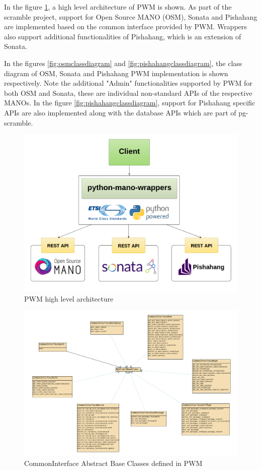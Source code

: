 In the figure \ref{fig:wrapperarch}, a high level architecture of PWM is shown. 
As part of the scramble project, support for Open Source MANO (OSM), Sonata and Pishahang are implemented based on the common interface provided by PWM. 
Wrappers also support additional functionalities of Pishahang, which is an extension of Sonata. 

In the figures \ref{fig:osmclassdiagram} and \ref{fig:pishahangclassdiagram}, the class diagram of OSM, Sonata and Pishahang PWM implementation is shown respectively. Note the additional "Admin" functionalities supported by PWM for both OSM and Sonata, these are individual non-standard APIs of the respective MANOs. In the figure \ref{fig:pishahangclassdiagram}, support for Pishahang specific APIs are also implemented along with the database APIs which are part of pg-scramble.

\begin{figure}
	\centering
	\includegraphics[width=1\linewidth]{figures/WrapperArch}
	\caption{PWM high level architecture}
	\label{fig:wrapperarch}
\end{figure}

\begin{figure}
	\centering
	\includegraphics[width=1\linewidth]{figures/common_interface_class_diagram}
	\caption{CommonInterface Abstract Base Classes defined in PWM}
	\label{fig:commonclassdiagram}
\end{figure}

